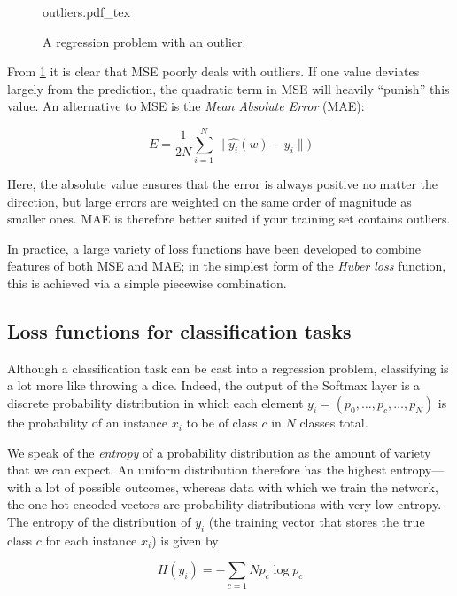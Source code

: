 \begin{figure}[htb]
    \centering
    \def\svgwidth{0.5\textwidth}
    {outliers.pdf_tex}
    \caption{A regression problem with an outlier.\label{fig:outliers}}
\end{figure}

From \cref{fig:outliers} it is clear that MSE poorly deals with outliers. If one value deviates largely from the prediction, the quadratic term in MSE will heavily ``punish'' this value. An alternative to MSE is the \textsl{Mean Absolute Error} (MAE):

\begin{equation}
E=\frac{1}{2N}\sum_{i=1}^N\|\hat{y_i}(w)-y_i\|)
\end{equation}

Here, the absolute value ensures that the error is always positive no matter the direction, but large errors are weighted on the same order of magnitude as smaller ones. MAE is therefore better suited if your training set contains outliers.

In practice, a large variety of loss functions have been developed to combine features of both MSE and MAE; in the simplest form of the \textsl{Huber loss} function, this is achieved via a simple piecewise combination.

\subsection{Loss functions for classification tasks}

Although a classification task can be cast into a regression problem, classifying is a lot more like throwing a dice. Indeed, the output of the Softmax layer is a discrete probability distribution in which each element $y_i=(p_0, \dots, p_c, \dots ,p_N)$ is the probability of an instance $x_i$ to be of class $c$ in $N$ classes total.

We speak of the \textsl{entropy} of a probability distribution as the amount of variety that we can expect. An uniform distribution therefore has the highest entropy---with a lot of possible outcomes, whereas data with which we train the network, the one-hot encoded vectors are probability distributions with very low entropy. The entropy of the distribution of $y_i$ (the training vector that stores the true class $c$ for each instance $x_i$) is given by

\begin{equation}
H(y_i)=-\sum_{c=1}{N}p_c \log p_c
\end{equation}


